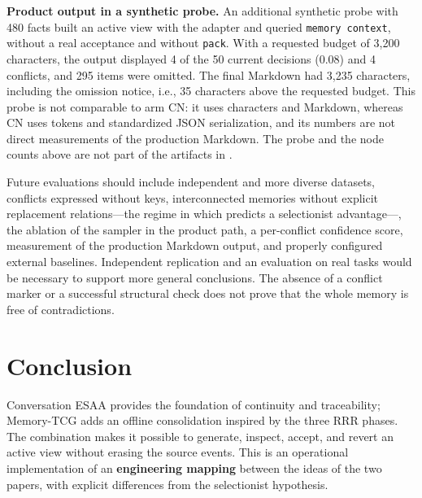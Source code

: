 \documentclass[11pt,a4paper]{article}
\begin{document}
\textbf{Product output in a synthetic probe.} An additional synthetic probe with 480 facts built an active view with the adapter and queried \texttt{memory context}, without a real acceptance and without \texttt{pack}. With a requested budget of 3,200 characters, the output displayed 4 of the 50 current decisions (0.08) and 4 conflicts, and 295 items were omitted. The final Markdown had 3,235 characters, including the omission notice, i.e., 35 characters above the requested budget. This probe is not comparable to arm CN: it uses characters and Markdown, whereas CN uses tokens and standardized JSON serialization, and its numbers are not direct measurements of the production Markdown. The probe and the node counts above are not part of the artifacts in \cite{ref9}.

Future evaluations should include independent and more diverse datasets, conflicts expressed without keys, interconnected memories without explicit replacement relations---the regime in which \cite{ref2} predicts a selectionist advantage---, the ablation of the sampler in the product path, a per-conflict confidence score, measurement of the production Markdown output, and properly configured external baselines. Independent replication and an evaluation on real tasks would be necessary to support more general conclusions. The absence of a conflict marker or a successful structural check does not prove that the whole memory is free of contradictions.

\section{Conclusion}\label{sec:7}
Conversation ESAA provides the foundation of continuity and traceability; Memory-TCG adds an offline consolidation inspired by the three RRR phases. The combination makes it possible to generate, inspect, accept, and revert an active view without erasing the source events. This is an operational implementation of an \textbf{engineering mapping} between the ideas of the two papers, with explicit differences from the selectionist hypothesis.
\end{document}
